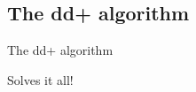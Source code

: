 \subsection{The dd+ algorithm}
\begin{frame}{The dd+ algorithm}
	\begin{center}
		Solves it all!
	\end{center}
\end{frame}